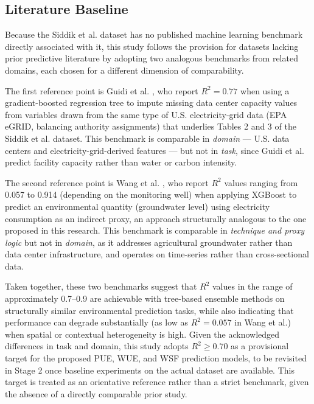 \documentclass[conference]{IEEEtran}
\begin{document}
\subsection{Literature Baseline}

Because the Siddik et al. \cite{Siddik2021} dataset has no published machine learning benchmark directly associated with it, this study follows the provision for datasets lacking prior predictive literature by adopting two analogous benchmarks from related domains, each chosen for a different dimension of comparability.

The first reference point is Guidi et al. \cite{Guidi2024}, who report $R^2 = 0.77$ when using a gradient-boosted regression tree to impute missing data center capacity values from variables drawn from the same type of U.S. electricity-grid data (EPA eGRID, balancing authority assignments) that underlies Tables 2 and 3 of the Siddik et al. dataset. This benchmark is comparable in \textit{domain} --- U.S. data centers and electricity-grid-derived features --- but not in \textit{task}, since Guidi et al. predict facility capacity rather than water or carbon intensity.

The second reference point is Wang et al. \cite{Wang2025XGBoost}, who report $R^2$ values ranging from 0.057 to 0.914 (depending on the monitoring well) when applying XGBoost to predict an environmental quantity (groundwater level) using electricity consumption as an indirect proxy, an approach structurally analogous to the one proposed in this research. This benchmark is comparable in \textit{technique and proxy logic} but not in \textit{domain}, as it addresses agricultural groundwater rather than data center infrastructure, and operates on time-series rather than cross-sectional data.

Taken together, these two benchmarks suggest that $R^2$ values in the range of approximately 0.7--0.9 are achievable with tree-based ensemble methods on structurally similar environmental prediction tasks, while also indicating that performance can degrade substantially (as low as $R^2 = 0.057$ in Wang et al.) when spatial or contextual heterogeneity is high. Given the acknowledged differences in task and domain, this study adopts $R^2 \geq 0.70$ as a provisional target for the proposed PUE, WUE, and WSF prediction models, to be revisited in Stage 2 once baseline experiments on the actual dataset are available. This target is treated as an orientative reference rather than a strict benchmark, given the absence of a directly comparable prior study.
\end{document}

